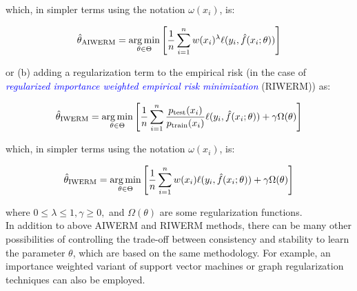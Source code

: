 which, in simpler terms using the notation $\omega(x_i)$, is:

\begin{equation}
    \hat{\theta}_{\text{AIWERM}} = \operatorname*{arg\,min}_{\theta \in \Theta} \left[ \frac{1}{n}\sum_{i=1}^{n} w(x_i)^{\lambda} \ell(y_i, \hat{f}(x_i; \theta)) \right]
    \label{eqn:4.22}
\end{equation}

or (b) adding a regularization term to the empirical risk (in the case of \textcolor{blue}{\emph{regularized importance weighted empirical risk minimization}} (RIWERM)) as:

\begin{equation}
    \hat{\theta}_{\text{IWERM}} = \operatorname*{arg\,min}_{\theta \in \Theta} \left[ \frac{1}{n}\sum_{i=1}^{n} \frac{p_{\text{test}}(x_i)}{p_{\text{train}}(x_i)} \ell(y_i, \hat{f}(x_i; \theta)) + \gamma \Omega(\theta) \right]
    \label{eqn:4.23}
\end{equation}

which, in simpler terms using the notation $\omega(x_i)$, is:

\begin{equation}
    \hat{\theta}_{\text{IWERM}} = \operatorname*{arg\,min}_{\theta \in \Theta} \left[ \frac{1}{n}\sum_{i=1}^{n} w(x_i) \ell(y_i, \hat{f}(x_i; \theta)) + \gamma \Omega(\theta) \right]
    \label{eqn:4.24}
\end{equation}

where $0 \leq \lambda \leq 1, \gamma \geq 0,$ and $\Omega(\theta)$ are some regularization functions.\\

In addition to above AIWERM and RIWERM methods, there can be many other possibilities of controlling the trade-off between consistency and stability to learn the parameter $\theta$, which are based on the same methodology.
For example, an importance weighted variant of support vector machines \citep{vapnik1998statistical, scholkopf2002learning, huang2007correcting} or graph regularization techniques \citep{bousquet2004measure, belkin2004semi, hein2006uniform} can also be employed.